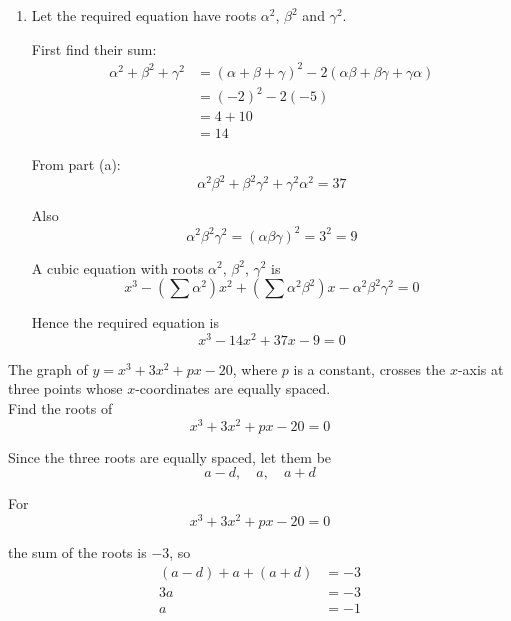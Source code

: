 \documentclass[leqno]{article}
\begin{document}
\begin{enumerate}[
  label=\textbf{\arabic*.},
  leftmargin=*,
  topsep=0pt,
  partopsep=0pt,
  parsep=0pt
]
\begin{djsSolution}
\begin{enumerate}[label=\textbf{(\alph*)}]
So
\begin{align*}
\alpha^2\beta^2+\beta^2\gamma^2+\gamma^2\alpha^2
&=(\alpha\beta+\beta\gamma+\gamma\alpha)^2-2\alpha\beta\gamma(\alpha+\beta+\gamma)\\
&=(-5)^2-2(3)(-2)\\
&=25+12\\
&=37
\end{align*}

  \item Let the required equation have roots $\alpha^2$, $\beta^2$ and $\gamma^2$.

First find their sum:
\begin{align*}
\alpha^2+\beta^2+\gamma^2
&=(\alpha+\beta+\gamma)^2-2(\alpha\beta+\beta\gamma+\gamma\alpha)\\
&=(-2)^2-2(-5)\\
&=4+10\\
&=14
\end{align*}

From part (a):
\[
\alpha^2\beta^2+\beta^2\gamma^2+\gamma^2\alpha^2=37
\]

Also
\[
\alpha^2\beta^2\gamma^2=(\alpha\beta\gamma)^2=3^2=9
\]

A cubic equation with roots \(\alpha^2\), \(\beta^2\), \(\gamma^2\) is
\[
x^3-\left(\sum\alpha^2\right)x^2+\left(\sum\alpha^2\beta^2\right)x-\alpha^2\beta^2\gamma^2=0
\]

Hence the required equation is
\[
x^3-14x^2+37x-9=0
\]
\end{enumerate}
\end{djsSolution}


\newpage

\questionitem

The graph of $y=x^3+3x^2+px-20$, where $p$ is a constant, crosses the $x$-axis at three points whose $x$-coordinates are equally spaced. \\

Find the roots of
\[
x^3+3x^2+px-20=0
\] 

\vspace*{10pt}

\begin{djsSolution}
Since the three roots are equally spaced, let them be
\[
a-d,\quad a,\quad a+d
\]

For
\[
x^3+3x^2+px-20=0
\]

the sum of the roots is \(-3\), so
\begin{align*}
(a-d)+a+(a+d)&=-3\\
3a&=-3\\
a&=-1
\end{align*}


\end{djsSolution}
\end{enumerate}
\end{document}
